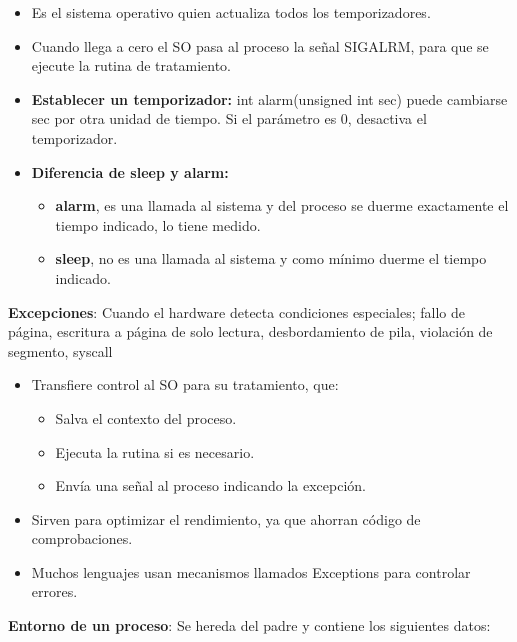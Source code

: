 \documentclass[12pt, twoside, openright]{report} %
\begin{document}
  \begin{itemize}
  \item Es el sistema operativo quien actualiza todos los temporizadores.
    
  \item Cuando llega a cero el SO pasa al proceso la señal SIGALRM, para que
    se ejecute la rutina de tratamiento.
    
  \end{itemize}

  \begin{itemize}
  \item \textbf{Establecer un temporizador:} int alarm(unsigned int sec)
    puede cambiarse sec por otra unidad de tiempo. Si el parámetro es 0,
    desactiva el temporizador.
    
  \item \textbf{Diferencia de sleep y alarm:}
    

    \begin{itemize}
    \item \textbf{alarm}, es una llamada al sistema y del proceso se duerme
      exactamente el tiempo indicado, lo tiene medido.
      
    \item \textbf{sleep}, no es una llamada al sistema y como mínimo duerme
      el tiempo indicado.
      
    \end{itemize}
  \end{itemize}
\textbf{Excepciones}: Cuando el hardware detecta condiciones
  especiales; fallo de página, escritura a página de solo lectura,
  desbordamiento de pila, violación de segmento, syscall
  
  \vspace{-0.5cm}

  \begin{itemize}
  \item Transfiere control al SO para su tratamiento, que:
    

    \begin{itemize}
    \item Salva el contexto del proceso.
      
    \item Ejecuta la rutina si es necesario.
      
    \item Envía una señal al proceso indicando la excepción.
      
    \end{itemize}
  \item Sirven para optimizar el rendimiento, ya que ahorran código de
    comprobaciones.
    
  \item Muchos lenguajes usan mecanismos llamados Exceptions para controlar
    errores.
    
  \end{itemize}
\textbf{Entorno de un proceso}: Se hereda del padre y contiene los
  siguientes datos:
  
\end{document}
